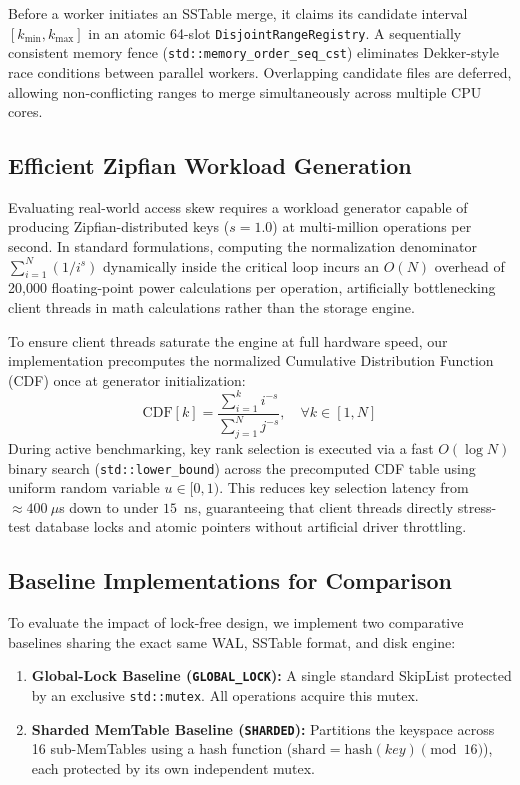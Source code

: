 \documentclass[conference]{IEEEtran}
\begin{document}
Before a worker initiates an SSTable merge, it claims its candidate interval $[k_{\min}, k_{\max}]$ in an atomic 64-slot \texttt{DisjointRangeRegistry}. A sequentially consistent memory fence (\texttt{std::memory\_order\_seq\_cst}) eliminates Dekker-style race conditions between parallel workers. Overlapping candidate files are deferred, allowing non-conflicting ranges to merge simultaneously across multiple CPU cores.

\subsection{Efficient Zipfian Workload Generation}
Evaluating real-world access skew requires a workload generator capable of producing Zipfian-distributed keys ($s=1.0$) at multi-million operations per second. In standard formulations, computing the normalization denominator $\sum_{i=1}^{N} (1/i^s)$ dynamically inside the critical loop incurs an $O(N)$ overhead of 20,000 floating-point power calculations per operation, artificially bottlenecking client threads in math calculations rather than the storage engine.

To ensure client threads saturate the engine at full hardware speed, our implementation precomputes the normalized Cumulative Distribution Function (CDF) once at generator initialization:
\begin{equation}
\text{CDF}[k] = \frac{\sum_{i=1}^{k} i^{-s}}{\sum_{j=1}^{N} j^{-s}}, \quad \forall k \in [1, N]
\end{equation}
During active benchmarking, key rank selection is executed via a fast $O(\log N)$ binary search (\texttt{std::lower\_bound}) across the precomputed CDF table using uniform random variable $u \in [0, 1)$. This reduces key selection latency from $\approx 400~\mu$s down to under $15$~ns, guaranteeing that client threads directly stress-test database locks and atomic pointers without artificial driver throttling.

\subsection{Baseline Implementations for Comparison}
To evaluate the impact of lock-free design, we implement two comparative baselines sharing the exact same WAL, SSTable format, and disk engine:
\begin{enumerate}
    \item \textbf{Global-Lock Baseline (\texttt{GLOBAL\_LOCK}):} A single standard SkipList protected by an exclusive \texttt{std::mutex}. All operations acquire this mutex.
    \item \textbf{Sharded MemTable Baseline (\texttt{SHARDED}):} Partitions the keyspace across 16 sub-MemTables using a hash function ($\text{shard} = \text{hash}(key) \pmod{16}$), each protected by its own independent mutex.
\end{enumerate}
\end{document}
